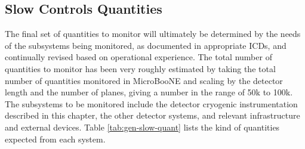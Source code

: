 \subsection{Slow Controls Quantities}
\label{sec:fdgen-slow-cryo-quant}


The final set of quantities to monitor will ultimately be determined
by the needs of the subsystems being monitored, as documented in
appropriate ICDs, and continually revised based on operational
experience.  The total number of quantities to monitor has been very
roughly estimated by taking the total number of quantities monitored
in MicroBooNE and scaling by the detector length and the number of
planes, giving a number in the range of 50k to 100k.  The subsystems
to be monitored include the detector cryogenic instrumentation
described in this chapter, the other detector systems, and relevant
infrastructure and external devices. Table \ref{tab:gen-slow-quant}
lists the kind of quantities expected from each system.


